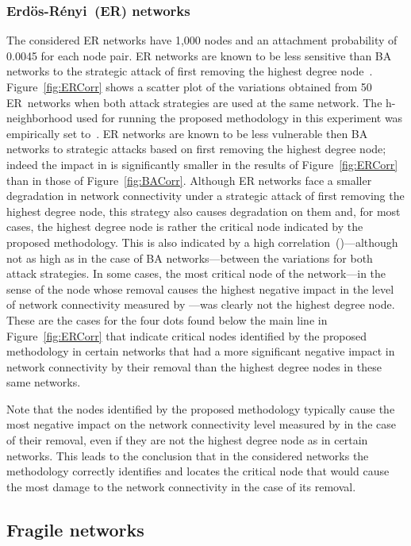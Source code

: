 \documentclass[conference,fleqn]{IEEEtran}
\begin{document}
\subsubsection{Erd\"{o}s-R\'{e}nyi~(ER) networks}
The considered ER networks have 1,000 nodes and an attachment probability of 0.0045 for each node pair.
ER networks are known to be less sensitive than BA networks to the strategic attack of first removing the highest degree node~\cite{Albert2000a}.
Figure~\ref{fig:ERCorr} shows a scatter plot of the  variations obtained from 50 ER~networks when
both attack strategies are used at the same network. 
The h-neighborhood used for running the proposed methodology in this experiment was 
empirically set to~. ER networks are known to be less vulnerable then BA networks to strategic attacks
based on first removing the highest degree node; indeed the impact in  is significantly smaller
in the results of Figure~\ref{fig:ERCorr} than in those of Figure~\ref{fig:BACorr}. Although ER networks
face a smaller degradation in network connectivity under a strategic attack of first removing the
highest degree node, this strategy also causes degradation on them and, for most cases, the highest
degree node is rather the critical node indicated by the proposed methodology. This is also indicated by a high correlation~()---although
not as high as in the case of BA networks---between the  variations for both attack strategies. In some cases,
the most critical node of the network---in the sense of the node whose removal causes the highest negative impact
in the level of network connectivity measured by ---was clearly not the highest degree node. These are
the cases for the four dots found below the main line in Figure~\ref{fig:ERCorr} that indicate critical nodes identified
by the proposed methodology in certain networks that had a more significant negative impact in network connectivity
by their removal than the highest degree nodes in these same networks.


Note that the nodes identified by the proposed methodology typically cause the most negative impact on the network connectivity 
level measured by  in the case of their removal, even if they are not the highest degree node as in certain networks.
This leads to the conclusion that in the considered networks the methodology correctly identifies and locates
the critical node that would cause the most damage to the network connectivity in the case of its removal.

\subsection{Fragile networks}
\label{subsec:fragile}
\end{document}
